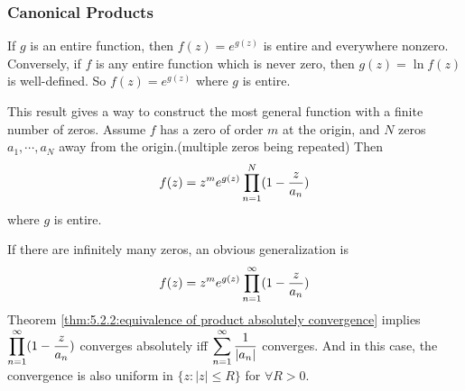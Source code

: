 \subsubsection{Canonical Products}
If  $ g  $ is an entire function, then  $ f(z)=e^{g(z)} $ is entire and everywhere nonzero. Conversely, if  $ f  $ is any entire function which is never zero, then  $ g(z)=\ln f(z)  $ is well-defined. So  $ f(z)=e^{g(z)} $ where  $ g  $ is entire. 

This result gives a way to construct the most general function with a finite number of zeros. Assume  $ f  $ has a zero of order  $ m  $ at the origin, and  $ N  $ zeros  $ a_1,\cdots,a_N $ away from the origin.(multiple zeros being repeated) Then 
\begin{equation}
    f(z)=z^me^{g(z)}\prod_{n=1}^N(1-\displaystyle\frac{z}{a_n})\label{eq:5.2.3:function with finite zeros}
\end{equation}
where  $ g  $ is entire.

If there are infinitely many zeros, an obvious generalization is 
\begin{equation}
    f(z)=z^me^{g(z)}\prod_{n=1}^\infty(1-\displaystyle\frac{z}{a_n})\label{eq:5.2.4:function with infinite zeros}
\end{equation}
Theorem \ref{thm:5.2.2:equivalence of product absolutely convergence} implies  $ \displaystyle\prod_{n=1}^\infty (1-\frac{z}{a_n}) $ converges absolutely iff  $ \displaystyle\sum_{n=1}^\infty\frac{1}{|a_n|} $ converges. And in this   case, the convergence is also uniform in  $ \{z:|z| \leq R\} $ for  $ \forall R>0 $.

